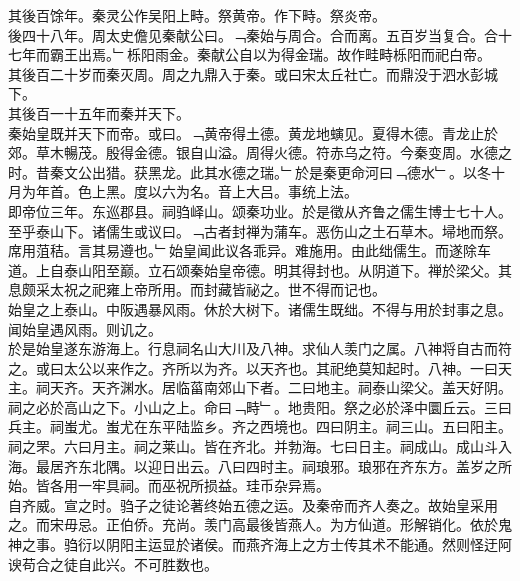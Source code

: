 \documentclass{zhvt-classic}
\begin{document}
\hspace*{2em}其後百馀年。秦灵公作吴阳上畤。祭黄帝。作下畤。祭炎帝。\\
\hspace*{2em}後四十八年。周太史儋见秦献公曰。﹁秦始与周合。合而离。五百岁当复合。合十七年而霸王出焉。﹂栎阳雨金。秦献公自以为得金瑞。故作畦畤栎阳而祀白帝。\\
\hspace*{2em}其後百二十岁而秦灭周。周之九鼎入于秦。或曰宋太丘社亡。而鼎没于泗水彭城下。\\
\hspace*{2em}其後百一十五年而秦并天下。\\
\hspace*{2em}秦始皇既并天下而帝。或曰。﹁黄帝得土德。黄龙地螾见。夏得木德。青龙止於郊。草木暢茂。殷得金德。银自山溢。周得火德。符赤乌之符。今秦变周。水德之时。昔秦文公出猎。获黑龙。此其水德之瑞。﹂於是秦更命河曰﹁德水﹂。以冬十月为年首。色上黑。度以六为名。音上大吕。事统上法。\\
\hspace*{2em}即帝位三年。东巡郡县。祠驺峄山。颂秦功业。於是徵从齐鲁之儒生博士七十人。至乎泰山下。诸儒生或议曰。﹁古者封禅为蒲车。恶伤山之土石草木。埽地而祭。席用菹秸。言其易遵也。﹂始皇闻此议各乖异。难施用。由此绌儒生。而遂除车道。上自泰山阳至巅。立石颂秦始皇帝德。明其得封也。从阴道下。禅於梁父。其息颇采太祝之祀雍上帝所用。而封藏皆祕之。世不得而记也。\\
\hspace*{2em}始皇之上泰山。中阪遇暴风雨。休於大树下。诸儒生既绌。不得与用於封事之息。闻始皇遇风雨。则讥之。\\
\hspace*{2em}於是始皇遂东游海上。行息祠名山大川及八神。求仙人羡门之属。八神将自古而符之。或曰太公以来作之。齐所以为齐。以天齐也。其祀绝莫知起时。八神。一曰天主。祠天齐。天齐渊水。居临菑南郊山下者。二曰地主。祠泰山梁父。盖天好阴。祠之必於高山之下。小山之上。命曰﹁畤﹂。地贵阳。祭之必於泽中圜丘云。三曰兵主。祠蚩尤。蚩尤在东平陆监乡。齐之西境也。四曰阴主。祠三山。五曰阳主。祠之罘。六曰月主。祠之莱山。皆在齐北。并勃海。七曰日主。祠成山。成山斗入海。最居齐东北隅。以迎日出云。八曰四时主。祠琅邪。琅邪在齐东方。盖岁之所始。皆各用一牢具祠。而巫祝所损益。珪币杂异焉。\\
\hspace*{2em}自齐威。宣之时。驺子之徒论著终始五德之运。及秦帝而齐人奏之。故始皇采用之。而宋毋忌。正伯侨。充尚。羡门高最後皆燕人。为方仙道。形解销化。依於鬼神之事。驺衍以阴阳主运显於诸侯。而燕齐海上之方士传其术不能通。然则怪迂阿谀苟合之徒自此兴。不可胜数也。\\
\end{document}
